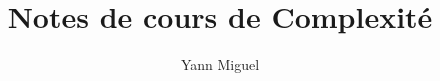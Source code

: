 \documentclass[12pt, a4paper]{article}
\title{Notes de cours de Complexité}
\author{Yann Miguel}
\begin{document}
\ttfamily
\maketitle
\tableofcontents
\newpage


\end{document}

